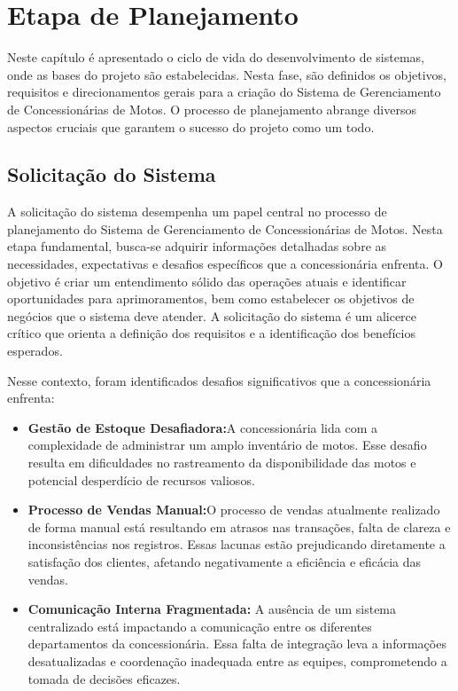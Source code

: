 
\chapter{Etapa de Planejamento}


Neste capítulo é apresentado o ciclo de vida do desenvolvimento de sistemas, onde as bases do projeto são estabelecidas. Nesta fase, são definidos os objetivos, requisitos e direcionamentos gerais para a criação do Sistema de Gerenciamento de Concessionárias de Motos. O processo de planejamento abrange diversos aspectos cruciais que garantem o sucesso do projeto como um todo.


\section{Solicita\c{c}\~{a}o do Sistema}
A solicitação do sistema desempenha um papel central no processo de planejamento do Sistema de Gerenciamento de Concessionárias de Motos. Nesta etapa fundamental, busca-se adquirir informações detalhadas sobre as necessidades, expectativas e desafios específicos que a concessionária enfrenta. O objetivo é criar um entendimento sólido das operações atuais e identificar oportunidades para aprimoramentos, bem como estabelecer os objetivos de negócios que o sistema deve atender. A solicitação do sistema é um alicerce crítico que orienta a definição dos requisitos e a identificação dos benefícios esperados.

Nesse contexto, foram identificados desafios significativos que a concessionária enfrenta:

\begin{itemize}
\item \textbf{Gestão de Estoque Desafiadora:}A concessionária lida com a complexidade de administrar um amplo inventário de motos. Esse desafio resulta em dificuldades no rastreamento da disponibilidade das motos e potencial desperdício de recursos valiosos.

\item \textbf{Processo de Vendas Manual:}O processo de vendas atualmente realizado de forma manual está resultando em atrasos nas transações, falta de clareza e inconsistências nos registros. Essas lacunas estão prejudicando diretamente a satisfação dos clientes, afetando negativamente a eficiência e eficácia das vendas.

\item \textbf{Comunicação Interna Fragmentada:} A ausência de um sistema centralizado está impactando a comunicação entre os diferentes departamentos da concessionária. Essa falta de integração leva a informações desatualizadas e coordenação inadequada entre as equipes, comprometendo a tomada de decisões eficazes.\\
\end{itemize}


